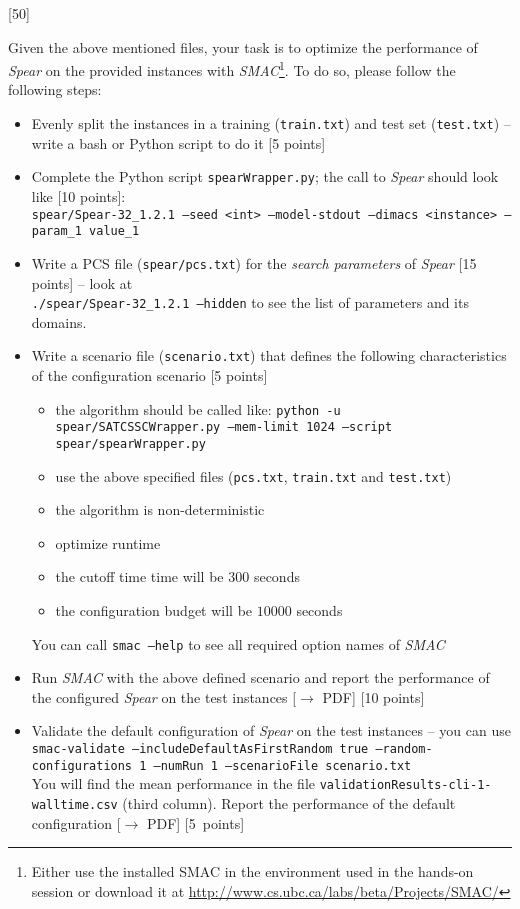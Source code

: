 \documentclass{exam}
\begin{document}
\begin{questions}

[50]

Given the above mentioned files, your task is to optimize the performance of \textit{Spear} on the provided instances with \textit{SMAC}\footnote{Either use the installed SMAC in the environment used in the hands-on session or download it at \url{http://www.cs.ubc.ca/labs/beta/Projects/SMAC/}}. 
To do so, please follow the following steps:

\begin{itemize}
  \item Evenly split the instances in a training (\texttt{train.txt}) and test set (\texttt{test.txt}) -- write a bash or Python script to do it [5 points] 
  \item Complete the Python script \texttt{spearWrapper.py}; the call to \textit{Spear} should look like [10 points]:\\
  		\texttt{spear/Spear-32\_1.2.1 --seed <int> --model-stdout --dimacs <instance> --param\_1 value\_1}
  \item Write a PCS file (\texttt{spear/pcs.txt}) for the \emph{search parameters} of \textit{Spear} [15 points] -- look at\\ \texttt{./spear/Spear-32\_1.2.1 --hidden} to see the list of parameters and its domains.   		 
  \item Write a scenario file (\texttt{scenario.txt}) that defines the following characteristics of the configuration scenario [5 points]
  \begin{itemize}
    \item the algorithm should be called like: \texttt{python -u spear/SATCSSCWrapper.py --mem-limit 1024 --script spear/spearWrapper.py}
    \item use the above specified files (\texttt{pcs.txt}, \texttt{train.txt} and \texttt{test.txt})
    \item the algorithm is non-deterministic
    \item optimize runtime
    \item the cutoff time time will be $300$ seconds
    \item the configuration budget will be $10000$ seconds
  \end{itemize}
  You can call \texttt{smac --help} to see all required option names of \textit{SMAC} 
  \item Run \textit{SMAC} with the above defined scenario and report the performance of the configured \textit{Spear} on the test instances [$\to$ PDF] [10 points]
  \item Validate the default configuration of \textit{Spear} on the test instances -- you can use\\
  		\texttt{smac-validate --includeDefaultAsFirstRandom true --random-configurations 1  --numRun 1 --scenarioFile scenario.txt}\\
  		You will find the mean performance in the file \texttt{validationResults-cli-1-walltime.csv} (third column).
  		Report the performance of the default configuration [$\to$ PDF] \mbox{[5 points]}
\end{itemize}


\end{questions}
\end{document}

